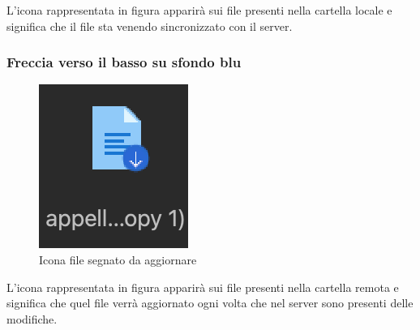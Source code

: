 L'icona rappresentata in figura apparirà sui file presenti nella cartella locale e significa che il file sta venendo sincronizzato con il server.

\subsubsection{Freccia verso il basso su sfondo blu}

\begin{figure}[H]
    \centering
    \includegraphics[scale = 0.8]{components/img/iconUpdate.png}
    \caption{Icona file segnato da aggiornare}
    \label{fig:greenI}
\end{figure}


L'icona rappresentata in figura apparirà sui file presenti nella cartella remota e significa che quel file verrà aggiornato ogni volta che nel server sono presenti delle modifiche.

